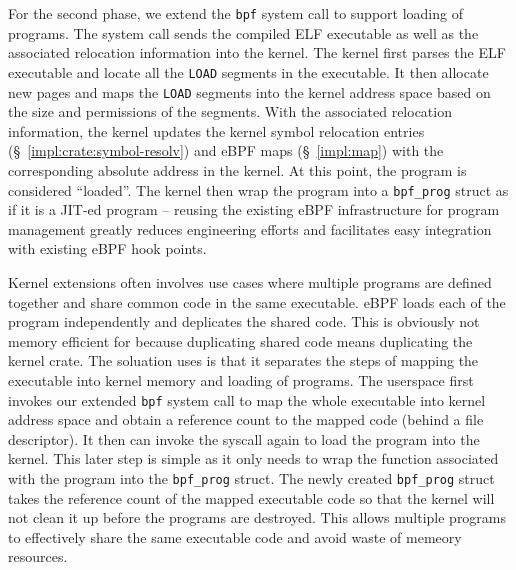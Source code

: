 For the second phase, we extend the \texttt{bpf} system call to support loading
    of \projname{} programs.
The system call sends the compiled ELF executable as well as the associated
    relocation information into the kernel.
The kernel first parses the ELF executable and locate all the \texttt{LOAD}
    segments in the executable.
It then allocate new pages and maps the \texttt{LOAD} segments into the
    kernel address space based on the size and permissions of the segments.
With the associated relocation information, the kernel updates the kernel
    symbol relocation entries (\S~\ref{impl:crate:symbol-resolv}) and eBPF maps
    (\S~\ref{impl:map}) with the corresponding absolute address in the kernel.
At this point, the program is considered ``loaded''.
The kernel then wrap the program into a \texttt{bpf\_prog} struct as if it is a
    JIT-ed program -- reusing the existing eBPF infrastructure for program
    management greatly reduces engineering efforts and facilitates easy
    integration with existing eBPF hook points.

Kernel extensions often involves use cases where multiple programs are defined
    together and share common code in the same executable.
eBPF loads each of the program independently and deplicates the shared code. 
This is obviously not memory efficient for \projname{} because duplicating
    shared code means duplicating the \projname{} kernel crate.
The soluation \projname{} uses is that it separates the steps of mapping the
    executable into kernel memory and loading of programs.
The userspace first invokes our extended \texttt{bpf} system call to map the
    whole executable into kernel address space and obtain a reference count to
    the mapped code (behind a file descriptor).
It then can invoke the syscall again to load the program into the kernel.
This later step is simple as it only needs to wrap the function associated with
    the \projname{} program into the \texttt{bpf\_prog} struct.
The newly created \texttt{bpf\_prog} struct takes the reference count of the
    mapped executable code so that the kernel will not clean it up before the
    programs are destroyed.
This allows multiple programs to effectively share the same executable code and
    avoid waste of memeory resources.

